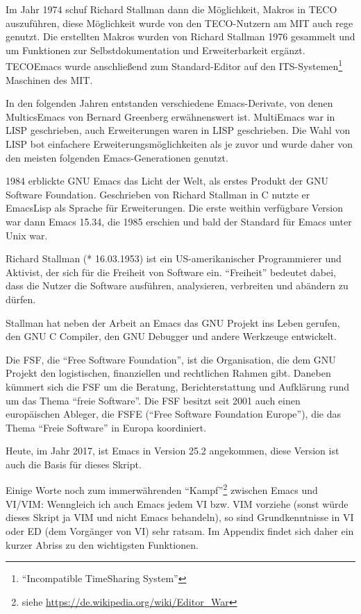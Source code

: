 \documentclass[12pt,ngerman]{scrbook}
\begin{document}
Im Jahr 1974 schuf Richard Stallman dann die Möglichkeit, Makros in TECO auszuführen, diese Möglichkeit wurde von den TECO-Nutzern am MIT auch rege genutzt. 
Die erstellten Makros wurden von Richard Stallman 1976 gesammelt und um Funktionen zur Selbstdokumentation und Erweiterbarkeit ergänzt. 
TECOEmacs wurde anschließend zum Standard-Editor auf den ITS-Systemen\footnote{\enquote{Incompatible TimeSharing System}} Maschinen des MIT.

In den folgenden Jahren entstanden verschiedene Emacs-Derivate, von denen MulticsEmacs von Bernard Greenberg erwähnenswert ist.
MultiEmacs war in LISP geschrieben, auch Erweiterungen waren in LISP geschrieben. Die Wahl von LISP bot einfachere Erweiterungsmöglichkeiten als je zuvor und wurde daher von den meisten folgenden Emacs-Generationen genutzt. 

1984 erblickte GNU Emacs das Licht der Welt, als erstes Produkt der GNU Software Foundation. 
Geschrieben von Richard Stallman in C nutzte er EmacsLisp als Sprache für Erweiterungen.
Die erste weithin verfügbare Version war dann Emacs 15.34, die 1985 erschien und bald der Standard für Emacs unter Unix war.

\begin{tcolorbox}[title={Wissen: Richard Stallman, GNU, und die Free Software Foundation},arc=0pt]
Richard Stallman (* 16.03.1953) ist ein US-amerikanischer Programmierer und Aktivist, der sich für die Freiheit von Software ein. \enquote{Freiheit} bedeutet dabei, dass die Nutzer die Software ausführen, analysieren, verbreiten und abändern zu dürfen. 

Stallman hat neben der Arbeit an Emacs das GNU Projekt ins Leben gerufen, den GNU C Compiler, den GNU Debugger und andere Werkzeuge entwickelt.

Die FSF, die \enquote{Free Software Foundation}, ist die Organisation, die dem GNU Projekt den logistischen, finanziellen und rechtlichen Rahmen gibt. Daneben kümmert sich die FSF um die Beratung, Berichterstattung und Aufklärung rund um das Thema \enquote{freie Software}. Die FSF besitzt seit 2001 auch einen europäischen Ableger, die FSFE (\enquote{Free Software Foundation Europe}), die das Thema \enquote{Freie Software} in Europa koordiniert.
\end{tcolorbox}

Heute, im Jahr 2017, ist Emacs in Version 25.2 angekommen, diese Version ist auch die Basis für dieses Skript.

Einige Worte noch zum immerwährenden \enquote{Kampf}\footnote{siehe \url{https://de.wikipedia.org/wiki/Editor_War}} zwischen Emacs und VI/VIM: Wenngleich ich auch Emacs jedem VI bzw. VIM vorziehe (sonst würde dieses Skript ja VIM und nicht Emacs behandeln), so sind Grundkenntnisse in VI oder ED (dem Vorgänger von VI) sehr ratsam. 
Im Appendix findet sich daher ein kurzer Abriss zu den wichtigsten Funktionen.
\end{document}
